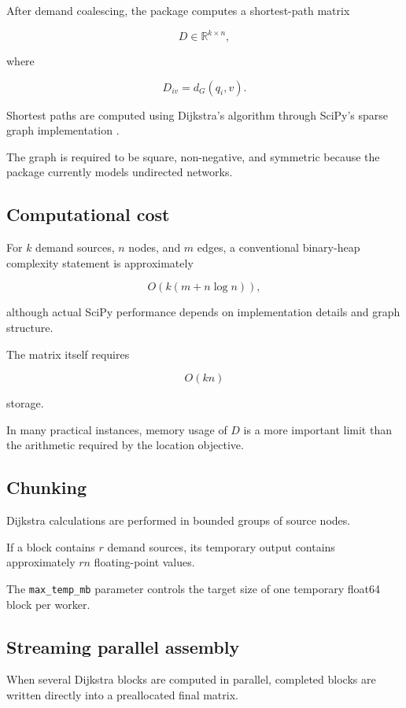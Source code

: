 \documentclass[11pt]{article}
\newcommand{\R}{\mathbb{R}}
\begin{document}
After demand coalescing, the package computes a shortest-path matrix

\[
D\in\R^{k\times n},
\]

where

\[
D_{iv}
=
d_G(q_i,v).
\]

Shortest paths are computed using Dijkstra's algorithm
\cite{Dijkstra1959} through SciPy's sparse graph implementation
\cite{SciPyDijkstra}.

The graph is required to be square, non-negative, and symmetric because the
package currently models undirected networks.

\subsection{Computational cost}

For \(k\) demand sources, \(n\) nodes, and \(m\) edges, a conventional
binary-heap complexity statement is approximately

\[
O\!\left(k(m+n\log n)\right),
\]

although actual SciPy performance depends on implementation details and graph
structure.

The matrix itself requires

\[
O(kn)
\]

storage.

In many practical instances, memory usage of \(D\) is a more important limit
than the arithmetic required by the location objective.

\subsection{Chunking}

Dijkstra calculations are performed in bounded groups of source nodes.

If a block contains \(r\) demand sources, its temporary output contains
approximately \(rn\) floating-point values.

The \texttt{max\_temp\_mb} parameter controls the target size of one temporary
float64 block per worker.

\subsection{Streaming parallel assembly}

When several Dijkstra blocks are computed in parallel, completed blocks are
written directly into a preallocated final matrix.
\end{document}
